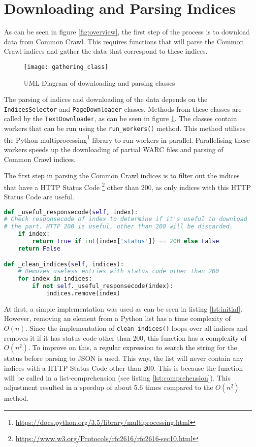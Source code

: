 \section{Downloading and Parsing Indices}\label{sec:5-downloading}

As can be seen in figure \ref{fig:overview}, the first step of the process is to download data from Common Crawl. This requires functions that will parse the Common Crawl indices and gather the data that correspond to these indices. 

\begin{figure}[H]
\centering
\texttt{[image: gathering\_class]}
\caption{UML Diagram of downloading and parsing classes}
\label{fig:gathering_class}
\end{figure}

The parsing of indices and downloading of the data depends on the \texttt{IndicesSelector} and \texttt{PageDownloader} classes. Methods from these classes are called by the \texttt{TextDownloader}, as can be seen in figure \ref{fig:gathering_class}. The classes contain workers that can be run using the \texttt{run\_workers()} method. This method utilises the Python multiprocessing\footnote{\url{https://docs.python.org/3.5/library/multiprocessing.html}} library to run workers in parallel. Parallelising these workers speeds up the downloading of partial WARC files and parsing of Common Crawl indices.

The first step in parsing the Common Crawl indices is to filter out the indices that have a HTTP Status Code \footnote{\url{https://www.w3.org/Protocols/rfc2616/rfc2616-sec10.html}} other than 200, as only indices with this HTTP Status Code are useful. 

\begin{lstlisting}[language=Python, caption=Initial implementation, label={lst:initial}]
def _useful_responsecode(self, index):
# Check responsecode of index to determine if it's useful to download
# the part. HTTP 200 is useful, other than 200 will be discarded.
    if index:
        return True if int(index['status']) == 200 else False
    return False

def _clean_indices(self, indices):
    # Removes useless entries with status code other than 200
    for index in indices:
        if not self._useful_responsecode(index):
            indices.remove(index)
\end{lstlisting}

At first, a simple implementation was used as can be seen in listing \ref{lst:initial}. However, removing an element from a Python list has a time complexity of $O(n)$. Since the implementation of \texttt{clean\_indices()} loops over all indices and removes it if it has status code other than 200, this function has a complexity of $O(n^2)$. To improve on this, a regular expression to search the string for the status before parsing to JSON is used. This way, the list will never contain any indices with a HTTP Status Code other than 200. This is because the function will be called in a list-comprehension (see listing \ref{lst:comprehension}). This adjustment resulted in a speedup of about 5.6 times compared to the $O(n^2)$ method.


